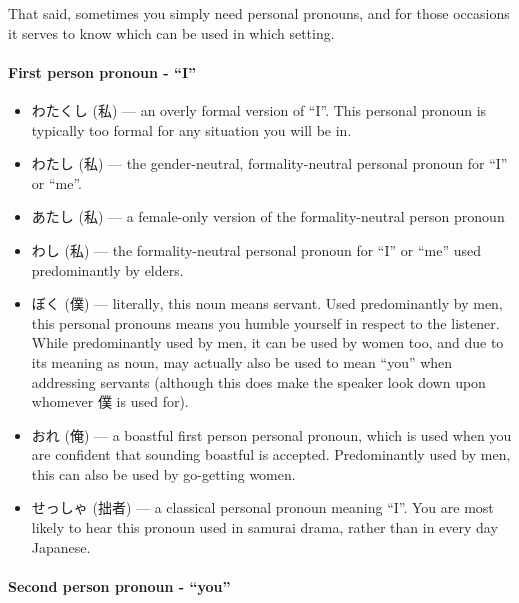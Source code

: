 \documentclass[11pt, b5paper, twoside, openright, onecolumn]{book}
\makeatletter
\newcommand*{\rubystack}[2]{{\relscale{0.5}%
  \begin{tabular}[b]{@{}c@{}}%
    {#1}\\%
   {\textscale{2}{#2}}%
  \end{tabular}}%
}
\DeclareRobustCommand*{\ruby}[2]{%
  \mbox{%
    \setlength{\parskip}{0ex}%
    \BeginAccSupp{method=pdfstringdef,ActualText={#1}}%
      \rubystack{\phantom{#2}}{#1}%
      \llap{%
        \rubystack{#2}{\phantom{#1}}%
      }%
    \EndAccSupp{}%
  }%
}
\renewcommand*{\ruby}[2]{#2 (#1)}%
\makeatother
\begin{document}
That said‚ sometimes you simply need personal pronouns‚ and for those occasions it serves to know which can be used in which setting.

\paragraph{First person pronoun - “I”}

\begin{itemize}
\item {}\ruby{私}{わたくし} — an overly formal version of “I”. This personal pronoun is typically too formal for any situation you will be in.
\item {}\ruby{私}{わたし} — the gender-neutral‚ formality-neutral personal pronoun for “I” or “me”.
\item {}\ruby{私}{あたし} — a female-only version of the formality-neutral person pronoun
\item {}\ruby{私}{わし} — the formality-neutral personal pronoun for “I” or “me” used predominantly by elders.
\item {}\ruby{僕}{ぼく} — literally‚ this noun means servant. Used predominantly by men‚ this personal pronouns means you humble yourself in respect to the listener. While predominantly used by men‚ it can be used by women too‚ and due to its meaning as noun‚ may actually also be used to mean “you” when addressing servants (although this does make the speaker look down upon whomever 僕 is used for).
\item {}\ruby{俺}{おれ} — a boastful first person personal pronoun‚ which is used when you are confident that sounding boastful is accepted. Predominantly used by men‚ this can also be used by go-getting women.
\item {}\ruby{拙者}{せっしゃ} — a classical personal pronoun meaning “I”. You are most likely to hear this pronoun used in samurai drama‚ rather than in every day Japanese.
\end{itemize}

\paragraph{Second person pronoun - “you”}
\end{document}
